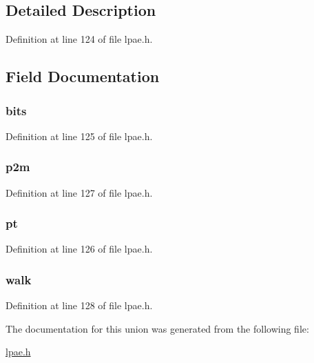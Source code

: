 \subsection{\-Detailed \-Description}


\-Definition at line 124 of file lpae.\-h.



\subsection{\-Field \-Documentation}
\hypertarget{unionlpaed__t_a824af546b997aeefcb71a5fe0eda3a0a}{
\subsubsection[{bits}]{ {\bf bits}}}\label{unionlpaed__t_a824af546b997aeefcb71a5fe0eda3a0a}


\-Definition at line 125 of file lpae.\-h.

\hypertarget{unionlpaed__t_a99761ab7c6ee8d403ed1a7483155089f}{
\subsubsection[{p2m}]{ {\bf p2m}}}\label{unionlpaed__t_a99761ab7c6ee8d403ed1a7483155089f}


\-Definition at line 127 of file lpae.\-h.

\hypertarget{unionlpaed__t_acddbc2df6cd0023f42d3076bd91794df}{
\subsubsection[{pt}]{ {\bf pt}}}\label{unionlpaed__t_acddbc2df6cd0023f42d3076bd91794df}


\-Definition at line 126 of file lpae.\-h.

\hypertarget{unionlpaed__t_a17c7b75f6d0703c70a29b68451c901f2}{
\subsubsection[{walk}]{ {\bf walk}}}\label{unionlpaed__t_a17c7b75f6d0703c70a29b68451c901f2}


\-Definition at line 128 of file lpae.\-h.



\-The documentation for this union was generated from the following file\-:\begin{DoxyCompactItemize}
\item 
\hyperlink{lpae_8h}{lpae.\-h}\end{DoxyCompactItemize}
